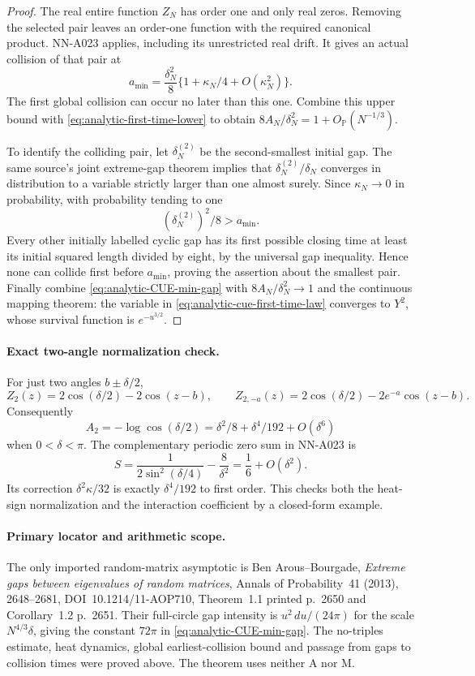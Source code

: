 \begin{proof}
The real entire function $Z_N$ has order one and only
real zeros. Removing the selected pair leaves an
order-one function with the required canonical product.
NN-A023 applies, including its unrestricted real drift.
It gives an actual collision of that pair at
\[
 a_{\min}=\frac{\delta_N^2}{8}
                    \{1+\kappa_N/4+O(\kappa_N^2)\}.
\]
The first global collision can occur no later than this
one. Combine this upper bound with
\eqref{eq:analytic-first-time-lower} to obtain
$8A_N/\delta_N^2=1+O_{\mathbb P}(N^{-1/3})$.

To identify the colliding pair, let $\delta_N^{(2)}$
be the second-smallest initial gap. The same source's
joint extreme-gap theorem implies that
$\delta_N^{(2)}/\delta_N$ converges in distribution
to a variable strictly larger than one almost surely.
Since $\kappa_N\to0$ in probability, with probability
tending to one
\[
                    (\delta_N^{(2)})^2/8>a_{\min}.
\]
Every other initially labelled cyclic gap has its
first possible closing time at least its initial
squared length divided by eight, by the universal
gap inequality. Hence none can collide first before
$a_{\min}$, proving the assertion about the smallest pair.
Finally combine \eqref{eq:analytic-CUE-min-gap} with
$8A_N/\delta_N^2\to1$ and the continuous mapping theorem:
the variable in \eqref{eq:analytic-cue-first-time-law}
converges to $Y^2$, whose survival function is
$e^{-u^{3/2}}$.
\end{proof}

\paragraph{Exact two-angle normalization check.}
For just two angles $b\pm\delta/2$,
\[
 Z_2(z)=2\cos(\delta/2)-2\cos(z-b),\qquad
 Z_{2,-a}(z)=2\cos(\delta/2)-2e^{-a}\cos(z-b).
\]
Consequently
\[
              A_2=-\log\cos(\delta/2)
                  =\delta^2/8+\delta^4/192+O(\delta^6)
\]
when $0<\delta<\pi$. The complementary periodic zero
sum in NN-A023 is
\[
          S=\frac1{2\sin^2(\delta/4)}-\frac8{\delta^2}
                                  =\frac16+O(\delta^2).
\]
Its correction $\delta^2\kappa/32$ is exactly
$\delta^4/192$ to first order. This checks both the
heat-sign normalization and the interaction coefficient
by a closed-form example.

\paragraph{Primary locator and arithmetic scope.}
The only imported random-matrix asymptotic is
Ben Arous--Bourgade, \emph{Extreme gaps between eigenvalues
of random matrices}, Annals of Probability~41 (2013),
2648--2681, DOI~10.1214/11-AOP710, Theorem~1.1
printed p.~2650 and Corollary~1.2 p.~2651.
Their full-circle gap intensity is
$u^2\,du/(24\pi)$ for the scale $N^{4/3}\delta$,
giving the constant $72\pi$ in
\eqref{eq:analytic-CUE-min-gap}. The no-triples estimate,
heat dynamics, global earliest-collision bound and
passage from gaps to collision times were proved above.
The theorem uses neither A nor M.

